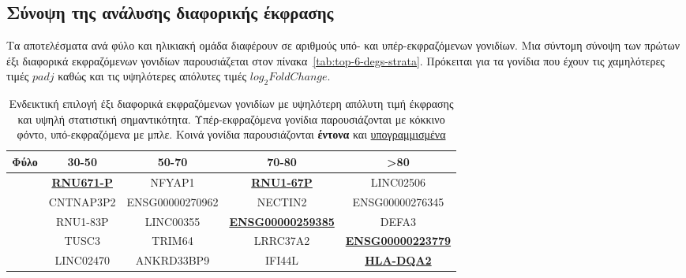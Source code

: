 \documentclass[12pt]{report}
\renewcommand{\arraystretch}{1.5}
\begin{document}
        \subsection{Σύνοψη της ανάλυσης διαφορικής έκφρασης}
            \par
                Τα αποτελέσματα ανά φύλο και ηλικιακή ομάδα διαφέρουν σε αριθμούς υπό- και υπέρ-εκφραζόμενων γονιδίων. Μια σύντομη σύνοψη των πρώτων έξι διαφορικά εκφραζόμενων γονιδίων παρουσιάζεται στον πίνακα~\ref{tab:top-6-degs-strata}. Πρόκειται για τα γονίδια που έχουν τις χαμηλότερες τιμές $padj$ καθώς και τις υψηλότερες απόλυτες τιμές $log_2FoldChange$.
                \begin{table}[ht]
                    \centering
                    \caption[Ενδεικτική επιλογή έξι διαφορικά εκφραζόμενων γονιδίων] {Ενδεικτική επιλογή έξι διαφορικά εκφραζόμενων γονιδίων με υψηλότερη απόλυτη τιμή έκφρασης και υψηλή στατιστική σημαντικότητα. Υπέρ-εκφραζόμενα γονίδια παρουσιάζονται με κόκκινο φόντο, υπό-εκφραζόμενα με μπλε. Κοινά γονίδια παρουσιάζονται \textbf{έντονα} και \underline{υπογραμμισμένα}}
                    \small
                    \setlength{\tabcolsep}{5pt}
                    \renewcommand{\arraystretch}{1.4}
                    \begin{tabular}{@{}>{\raggedright}p{1.3cm}cccc@{}}
                        \toprule
                        \textbf{Φύλο} & \textbf{30-50} & \textbf{50-70} & \textbf{70-80} & \textbf{>80} \\
                        \midrule
                        \multirow{6}{*}{'Ανδρες}
                        & \cellcolor{blue!20}\textbf{\underline{RNU671-P}} & \cellcolor{red!20}NFYAP1 & \cellcolor{blue!20}\textbf{\underline{RNU1-67P}} & \cellcolor{blue!20}LINC02506 \\
                        & \cellcolor{blue!20}CNTNAP3P2 & \cellcolor{red!20}ENSG00000270962 & \cellcolor{blue!20}NECTIN2 & \cellcolor{blue!20}ENSG00000276345 \\
                        & \cellcolor{blue!20}RNU1-83P & \cellcolor{red!20}LINC00355 & \cellcolor{red!20}\textbf{\underline{ENSG00000259385}} & \cellcolor{blue!20}DEFA3 \\
                        & \cellcolor{blue!20}TUSC3 & \cellcolor{red!20}TRIM64 & \cellcolor{red!20}LRRC37A2 & \cellcolor{blue!20}\textbf{\underline{ENSG00000223779}} \\
                        & \cellcolor{blue!20}LINC02470 & \cellcolor{red!20}ANKRD33BP9 & \cellcolor{blue!20}IFI44L & \cellcolor{red!20}\textbf{\underline{HLA-DQA2}} \\

\end{tabular}
\end{table}
\end{document}
